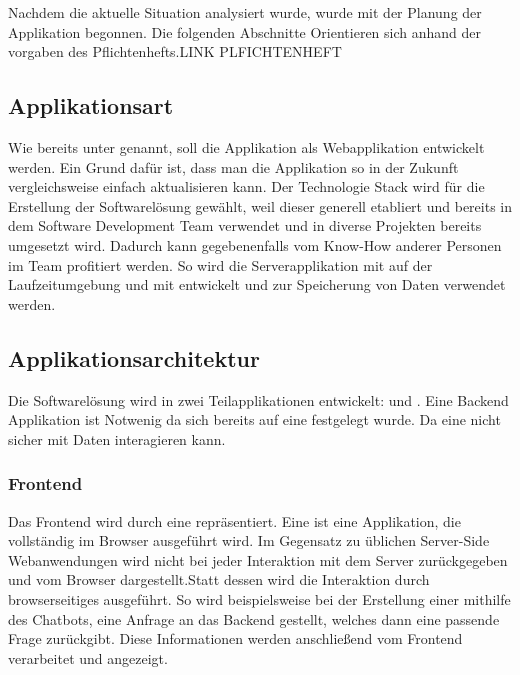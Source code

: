 Nachdem die aktuelle Situation analysiert wurde, wurde mit der Planung der Applikation begonnen. Die folgenden Abschnitte Orientieren sich anhand der vorgaben des Pflichtenhefts.\todo LINK PLFICHTENHEFT

\subsection{Applikationsart}

Wie bereits unter  genannt, soll die Applikation als Webapplikation entwickelt werden. Ein Grund dafür ist, dass man die Applikation so in der Zukunft
vergleichsweise einfach aktualisieren kann. Der Technologie Stack  wird für die Erstellung der Softwarelösung gewählt, weil dieser generell etabliert und bereits in dem Software Development Team verwendet und in diverse Projekten bereits umgesetzt wird. Dadurch kann gegebenenfalls vom Know-How anderer Personen im Team profitiert werden. So wird die Serverapplikation mit  auf der Laufzeitumgebung  und  mit  entwickelt und  zur Speicherung von Daten verwendet werden.

\subsection{Applikationsarchitektur}
\label{sec:Planungsphase:Applikationsarchitektur}

Die Softwarelösung wird in zwei Teilapplikationen entwickelt:  und . Eine Backend Applikation ist Notwenig da sich bereits auf eine  festgelegt wurde. Da eine  nicht sicher mit Daten interagieren kann.

\subsubsection{Frontend}
\label{sec:Planungsphase:Frontend}

Das Frontend wird durch eine  repräsentiert. Eine  ist eine Applikation, die vollständig im Browser ausgeführt wird.  Im Gegensatz zu üblichen Server-Side Webanwendungen wird nicht bei jeder Interaktion mit dem Server  zurückgegeben und vom Browser dargestellt.Statt dessen wird die Interaktion durch browserseitiges  ausgeführt.
So wird beispielsweise bei der Erstellung einer  mithilfe des Chatbots, eine Anfrage an das Backend gestellt, welches dann eine passende Frage zurückgibt. Diese Informationen werden anschließend vom Frontend verarbeitet und angezeigt.

